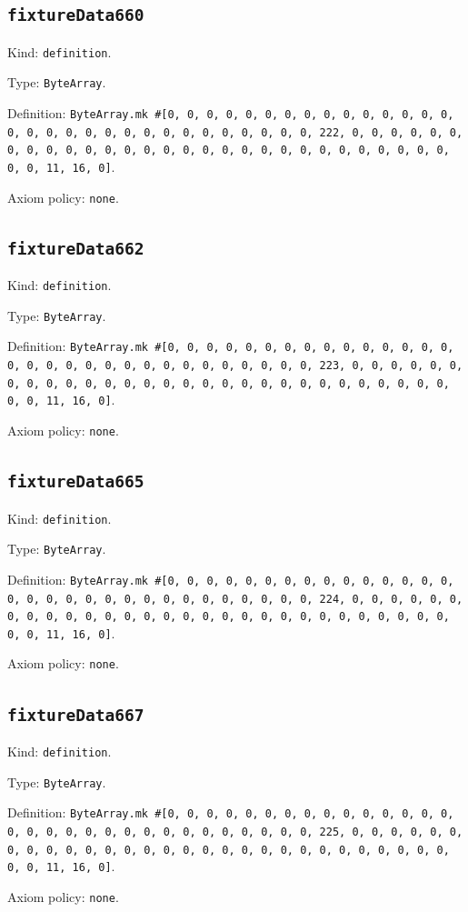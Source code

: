 \documentclass[11pt]{article}
\begin{document}
\subsection*{\texttt{fixtureData660}}
\noindent Kind: \texttt{definition}.\par
\noindent Type: \texttt{ByteArray}.\par
\noindent Definition: \texttt{ByteArray.mk \#[0, 0, 0, 0, 0, 0, 0, 0, 0, 0, 0, 0, 0, 0, 0, 0, 0, 0, 0, 0, 0, 0, 0, 0, 0, 0, 0, 0, 0, 0, 0, 222, 0, 0, 0, 0, 0, 0, 0, 0, 0, 0, 0, 0, 0, 0, 0, 0, 0, 0, 0, 0, 0, 0, 0, 0, 0, 0, 0, 0, 0, 0, 0, 11, 16, 0]}.\par
\noindent Axiom policy: \texttt{none}.\par
\subsection*{\texttt{fixtureData662}}
\noindent Kind: \texttt{definition}.\par
\noindent Type: \texttt{ByteArray}.\par
\noindent Definition: \texttt{ByteArray.mk \#[0, 0, 0, 0, 0, 0, 0, 0, 0, 0, 0, 0, 0, 0, 0, 0, 0, 0, 0, 0, 0, 0, 0, 0, 0, 0, 0, 0, 0, 0, 0, 223, 0, 0, 0, 0, 0, 0, 0, 0, 0, 0, 0, 0, 0, 0, 0, 0, 0, 0, 0, 0, 0, 0, 0, 0, 0, 0, 0, 0, 0, 0, 0, 11, 16, 0]}.\par
\noindent Axiom policy: \texttt{none}.\par
\subsection*{\texttt{fixtureData665}}
\noindent Kind: \texttt{definition}.\par
\noindent Type: \texttt{ByteArray}.\par
\noindent Definition: \texttt{ByteArray.mk \#[0, 0, 0, 0, 0, 0, 0, 0, 0, 0, 0, 0, 0, 0, 0, 0, 0, 0, 0, 0, 0, 0, 0, 0, 0, 0, 0, 0, 0, 0, 0, 224, 0, 0, 0, 0, 0, 0, 0, 0, 0, 0, 0, 0, 0, 0, 0, 0, 0, 0, 0, 0, 0, 0, 0, 0, 0, 0, 0, 0, 0, 0, 0, 11, 16, 0]}.\par
\noindent Axiom policy: \texttt{none}.\par
\subsection*{\texttt{fixtureData667}}
\noindent Kind: \texttt{definition}.\par
\noindent Type: \texttt{ByteArray}.\par
\noindent Definition: \texttt{ByteArray.mk \#[0, 0, 0, 0, 0, 0, 0, 0, 0, 0, 0, 0, 0, 0, 0, 0, 0, 0, 0, 0, 0, 0, 0, 0, 0, 0, 0, 0, 0, 0, 0, 225, 0, 0, 0, 0, 0, 0, 0, 0, 0, 0, 0, 0, 0, 0, 0, 0, 0, 0, 0, 0, 0, 0, 0, 0, 0, 0, 0, 0, 0, 0, 0, 11, 16, 0]}.\par
\noindent Axiom policy: \texttt{none}.\par
\end{document}
